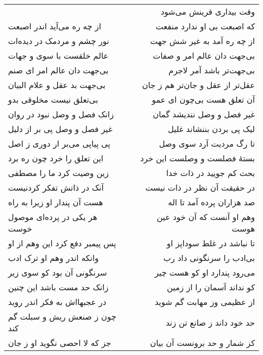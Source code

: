 \begin{center}
\begin{longtable}{l p{0.5cm} r}
&&
وقت بیداری قرینش می‌شود
\\
از چه ره می‌آید اندر اصبعت
&&
که اصبعت بی او ندارد منفعت
\\
نور چشم و مردمک در دیده‌ات
&&
از چه ره آمد به غیر شش جهت
\\
عالم خلقست با سوی و جهات
&&
بی‌جهت دان عالم امر و صفات
\\
بی‌جهت دان عالم امر ای صنم
&&
بی‌جهت‌تر باشد آمر لاجرم
\\
بی‌جهت بد عقل و علام البیان
&&
عقل‌تر از عقل و جان‌تر هم ز جان
\\
بی‌تعلق نیست مخلوقی بدو
&&
آن تعلق هست بی‌چون ای عمو
\\
زانک فصل و وصل نبود در روان
&&
غیر فصل و وصل نندیشد گمان
\\
غیر فصل و وصل پی بر از دلیل
&&
لیک پی بردن بننشاند غلیل
\\
پی پیاپی می‌بر ار دوری ز اصل
&&
تا رگ مردیت آرد سوی وصل
\\
این تعلق را خرد چون ره برد
&&
بستهٔ فصلست و وصلست این خرد
\\
زین وصیت کرد ما را مصطفی
&&
بحث کم جویید در ذات خدا
\\
آنک در ذاتش تفکر کردنیست
&&
در حقیقت آن نظر در ذات نیست
\\
هست آن پندار او زیرا به راه
&&
صد هزاران پرده آمد تا اله
\\
هر یکی در پرده‌ای موصول خوست
&&
وهم او آنست که آن خود عین هوست
\\
پس پیمبر دفع کرد این وهم از او
&&
تا نباشد در غلط سوداپز او
\\
وانکه اندر وهم او ترک ادب
&&
بی‌ادب را سرنگونی داد رب
\\
سرنگونی آن بود کو سوی زیر
&&
می‌رود پندارد او کو هست چیر
\\
زانک حد مست باشد این چنین
&&
کو نداند آسمان را از زمین
\\
در عجبهااش به فکر اندر روید
&&
از عظیمی وز مهابت گم شوید
\\
چون ز صنعش ریش و سبلت گم کند
&&
حد خود داند ز صانع تن زند
\\
جز که لا احصی نگوید او ز جان
&&
کز شمار و حد برونست آن بیان
\\
\end{longtable}
\end{center}
